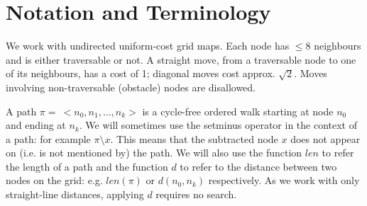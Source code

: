 \section{Notation and Terminology}
\label{sec:notation}
We work with undirected uniform-cost grid maps.
Each node has $\leq 8$ neighbours and is either traversable or not. 
A straight move, from a traversable node to one of its neighbours, 
has a cost of 1; diagonal moves cost approx. $\sqrt 2$.
Moves involving non-traversable (obstacle) nodes are disallowed.

A path $\pi =~<n_{0}, n_{1}, \ldots , n_{k}>$ is a
cycle-free ordered walk starting at node $n_{0}$ and ending at 
$n_{k}$.
We will sometimes use the setminus operator in the context of a path:
for example $\pi \setminus x$. This means that the subtracted node $x$
does not appear on (i.e. is not mentioned by) the path. 
We will also use the function $len$ to refer the length of a path 
and the function $d$ to refer to the distance between two nodes 
on the grid: e.g. $len(\pi)$ or $d(n_{0}, n_{k})$ respectively.
As we work with only straight-line distances, applying $d$ requires no search.



